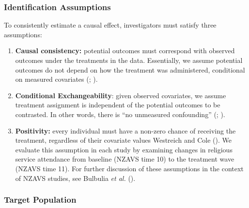 \documentclass[
  single column]{article}
\begin{document}
\subsubsection{Identification
Assumptions}\label{identification-assumptions}

To consistently estimate a causal effect, investigators must satisfy
three assumptions:

\begin{enumerate}
\def\labelenumi{\arabic{enumi}.}
\item
  \textbf{Causal consistency:} potential outcomes must correspond with
  observed outcomes under the treatments in the data. Essentially, we
  assume potential outcomes do not depend on how the treatment was
  administered, conditional on measured covariates
  (;
  ).
\item
  \textbf{Conditional Exchangeability}: given observed covariates, we
  assume treatment assignment is independent of the potential outcomes
  to be contrasted. In other words, there is ``no unmeasured
  confounding'' (;
  ).
\item
  \textbf{Positivity:} every individual must have a non-zero chance of
  receiving the treatment, regardless of their covariate values
  Westreich and Cole (). We evaluate
  this assumption in each study by examining changes in religious
  service attendance from baseline (NZAVS time 10) to the treatment wave
  (NZAVS time 11). For further discussion of these assumptions in the
  context of NZAVS studies, see Bulbulia \emph{et al.}
  ().
\end{enumerate}

\subsubsection{Target Population}\label{target-population}
\end{document}
